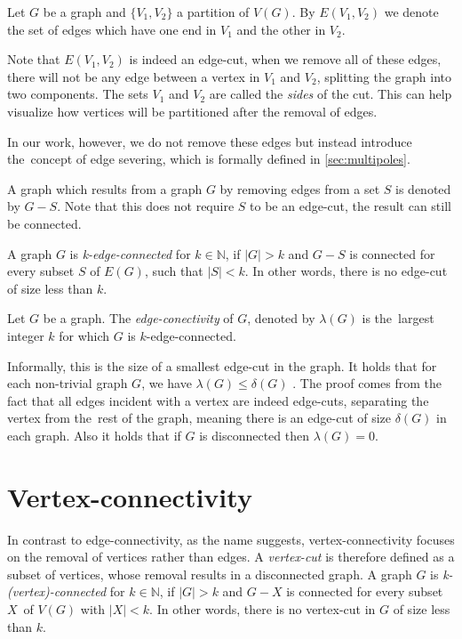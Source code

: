 \documentclass[12pt, twoside]{book}
\begin{document}
\begin{definition}
	Let $G$ be a graph and $\{V_1,V_2\}$ a partition of $V(G)$. By $E(V_1,V_2)$ we denote the set of edges which have one end in $V_1$ and the other in $V_2$.
\end{definition}

Note that $E(V_1,V_2)$ is indeed an edge-cut, when we remove all of these edges, there will not be any edge between a vertex in $V_1$ and $V_2$, splitting the graph into two components. The sets $V_1$ and $V_2$ are called the \textit{sides} of the cut. This can help visualize how vertices will be partitioned after the removal of edges.

In our work, however, we do not remove these edges but instead introduce the~concept of edge severing, which is formally defined in \cref{sec:multipoles}.

A graph which results from a graph $G$ by removing edges from a set $S$ is denoted by $G-S$. Note that this does not require $S$ to be an edge-cut, the result can still be connected.

A graph $G$ is \textit{k-edge-connected} for $k\in\mathbb{N}$, if $|G|>k$ and $G-S$ is connected for every subset $S$ of $E(G)$, such that $|S|<k$. In other words, there is no edge-cut of size less than $k$.

\begin{definition}
	Let $G$ be a graph. The \textit{edge-conectivity} of $G$, denoted by $\lambda(G)$ is the~largest integer $k$ for which $G$ is $k$-edge-connected.
\end{definition}

Informally, this is the size of a smallest edge-cut in the graph. It holds that for each non-trivial graph $G$, we have $\lambda(G)\leq\delta(G)$ \cite{Diestel}. The proof comes from the fact that all edges incident with a vertex are indeed edge-cuts, separating the vertex from the~rest of the graph, meaning there is an edge-cut of size $\delta(G)$ in each graph. Also it holds that if $G$ is disconnected then $\lambda(G)=0$.

\section{Vertex-connectivity}

In contrast to edge-connectivity, as the name suggests, vertex-connectivity focuses on the removal of vertices rather than edges. A \textit{vertex-cut} is therefore defined as a subset of vertices, whose removal results in a disconnected graph. A graph $G$ is \textit{k-(vertex)-connected} for $k\in\mathbb{N}$, if $|G|>k$ and $G-X$ is connected for every subset $X$~of $V(G)$ with $|X|<k$. In other words, there is no vertex-cut in $G$ of size less than $k$.
\end{document}
